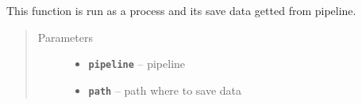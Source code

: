 \documentclass[12pt]{article}
\begin{document}
\label{index:module-saver}

\begin{fulllineitems}
\label{index:saver.data_saver}
This function is run as a process and its save data getted from pipeline.
\begin{quote}\begin{description}
\item[{Parameters}] \leavevmode\begin{itemize}
\item {} 
\textbf{\texttt{pipeline}} -- pipeline

\item {} 
\textbf{\texttt{path}} -- path where to save data

\end{itemize}

\end{description}\end{quote}

\end{fulllineitems}
\end{document}
